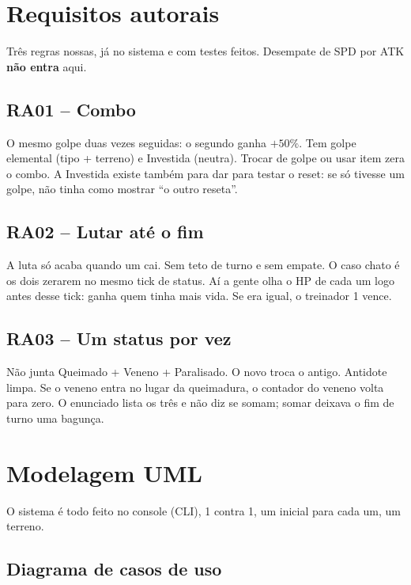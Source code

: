\documentclass[12pt,oneside,a4paper,article]{abntex2}
\begin{document}
\section{Requisitos autorais}
\label{sec:autorais}

Três regras nossas, já no sistema e com testes feitos. Desempate de SPD
por ATK \textbf{não entra} aqui.

\subsection{RA01 -- Combo}

O mesmo golpe duas vezes seguidas: o segundo ganha $+50\%$. Tem golpe
elemental (tipo + terreno) e Investida (neutra). Trocar de golpe ou usar item
zera o combo. A Investida existe também para dar para testar o reset: se só
tivesse um golpe, não tinha como mostrar ``o outro reseta''.

\subsection{RA02 -- Lutar até o fim}

A luta só acaba quando um cai. Sem teto de turno e sem empate. O caso chato
é os dois zerarem no mesmo tick de status. Aí a gente olha o HP de cada um
logo antes desse tick: ganha quem tinha mais vida. Se era igual, o treinador 1 vence.

\subsection{RA03 -- Um status por vez}

Não junta Queimado + Veneno + Paralisado. O novo troca o antigo. Antidote
limpa. Se o veneno entra no lugar da queimadura, o contador do veneno volta
para zero. O enunciado lista os três e não diz se somam; somar deixava o fim
de turno uma bagunça.

\section{Modelagem UML}
\label{sec:uml}

O sistema é todo feito no console (CLI), 1 contra 1, um inicial para cada um, um terreno.

\subsection{Diagrama de casos de uso}
\end{document}
